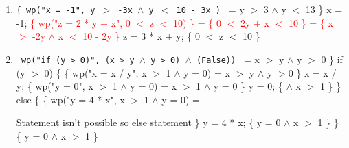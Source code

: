 \documentclass[11pt]{article}
\begin{document}
\begin{enumerate}

\item \texttt{\{ wp("x = -1", y $>$ -3x $\land$ y $<$ 10 - 3x ) } = { y $>$ 3 $\land$ y $<$ 13 \} %
\newline
x = -1;
\newline
\hspace*{0.5cm} \textcolor{red}{\{ wp("z = 2 * y + x", 0 $<$ z $<$ 10) \} = \{ 0 $<$ 2y + x $<$ 10 \} = 
\newline
\hspace*{0.5cm} \{ x $>$ -2y $\land$ x $<$ 10 - 2y \}}
\newline
z = 3 * x + y;
\newline
 \{ 0 $<$ z $<$ 10 \}}

\item \texttt{\ wp("if (y > 0)", (x > y $\land$ y > 0) $\land$ (False)) } = { x $>$ y $\land$ y $>$ 0 \}
\newline
if (y $>$ 0) \{
\newline
\hspace*{1cm}\{ wp("x = x / y", x $>$ 1 $\land$ y = 0) } = { x $>$ y $\land$ y $> $0 \}
\newline
\hspace*{0.5cm} x = x / y;
\newline
\hspace*{1cm}\{ wp("y = 0", x $>$ 1 $\land$ y = 0) } = { x $>$ 1 $\land$ y = 0 \}
\newline
\hspace*{0.5cm} y = 0;
\newline
\hspace*{1cm}\{  $\land$ x $>$ 1 \}
\newline
\} else \{
\newline
\hspace*{1cm}\{ wp("y = 4 * x", x $>$ 1 $\land$ y = 0) } = { Statement isn't possible so else statement \}
\newline
\hspace*{0.5cm} y = 4 * x;
\newline
\hspace*{1cm}\{ y = 0 $\land$ x $>$ 1 \}
\newline
\}
\newline
 \{ y = 0 $\land$ x $>$ 1 \}

}
\end{enumerate}
\end{document}

